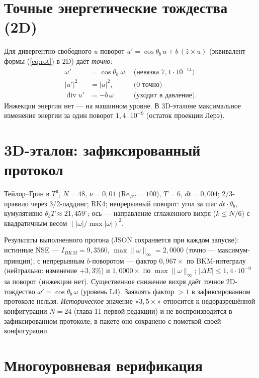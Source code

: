 \documentclass[12pt]{article}
\begin{document}
\section{Точные энергетические тождества (2D)}

Для дивергентно-свободного $u$ поворот $u'=\cos\theta_b\,u+b\,(\hat z\times u)$
(эквивалент формы (\ref{eq:rot}) в 2D) даёт \emph{точно}:
\begin{align}
\omega'&=\cos\theta_b\;\omega, & \text{(невязка } 7{,}1\cdot10^{-14}\text{)}\\
|u'|^{2}&=|u|^{2}, & \text{(}0\text{ точно)}\\
\operatorname{div}u'&=-b\,\omega & \text{(уходит в давление).}
\end{align}
Инжекции энергии нет --- на машинном уровне. В 3D-эталоне максимальное
изменение энергии за один поворот $1{,}4\cdot10^{-9}$ (остаток проекции Лерэ).

\section{3D-эталон: зафиксированный протокол}

Тейлор--Грин в $T^{3}$, $N=48$, $\nu=0{,}01$ ($\mathrm{Re}_{TG}=100$), $T=6$,
$dt=0{,}004$; 2/3-правило через 3/2-паддинг; RK4; непрерывный поворот:
угол за шаг $dt\cdot\theta_b$, кумулятивно $\theta_b T\approx 21{,}459^\circ$;
ось --- направление сглаженного вихря ($k\le N/6$) с квадратичным весом
$(|\omega|/\max|\omega|)^{2}$.

Результаты выполненного прогона (JSON сохраняется при каждом запуске):
истинные NSE --- $I_{BKM}=9{,}3560$, $\max\|\omega\|_\infty=2{,}0000$ (точно ---
максимум-принцип); с непрерывным $b$-поворотом --- фактор $0{,}967\times$ по
BKM-интегралу (нейтрально: изменение $+3{,}3\%$) и $1{,}0000\times$ по
$\max\|\omega\|_\infty$; $|\Delta E|\le1{,}4\cdot10^{-9}$ за поворот (инжекции нет).
Существенное снижение вихря даёт точное 2D-тождество
$\omega'=\cos\theta_b\,\omega$ (уровень L4). Заявлять фактор $>1$ в
зафиксированном протоколе нельзя. \emph{Историческое} значение
«$3{,}5\times$» относится к недоразрешённой конфигурации $N=24$ (глава 11
первой редакции) и не воспроизводится в зафиксированном протоколе; в пакете
оно сохранено с пометкой своей конфигурации.

\section{Многоуровневая верификация}
\end{document}
